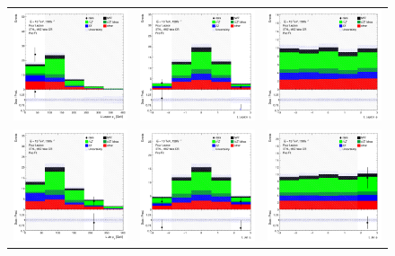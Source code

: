 \begin{figure}[htbp]
\centering
  \begin{tabular}{ccc}


    \includegraphics[width=.25\textwidth]{figures/PreFitPlots/lep4_tWZ_3T1L_L_lepton_pt.png} &
    \includegraphics[width=.25\textwidth]{figures/PreFitPlots/lep4_tWZ_3T1L_L_lepton_eta.png} &
    \includegraphics[width=.25\textwidth]{figures/PreFitPlots/lep4_tWZ_3T1L_L_lepton_phi.png} \\
    \includegraphics[width=.25\textwidth]{figures/PreFitPlots/lep4_tWZ_3T1L_LJet_pt.png} &
    \includegraphics[width=.25\textwidth]{figures/PreFitPlots/lep4_tWZ_3T1L_LJet_eta.png} &
    \includegraphics[width=.25\textwidth]{figures/PreFitPlots/lep4_tWZ_3T1L_LJet_phi.png} \\


\end{tabular}
\end{figure}
